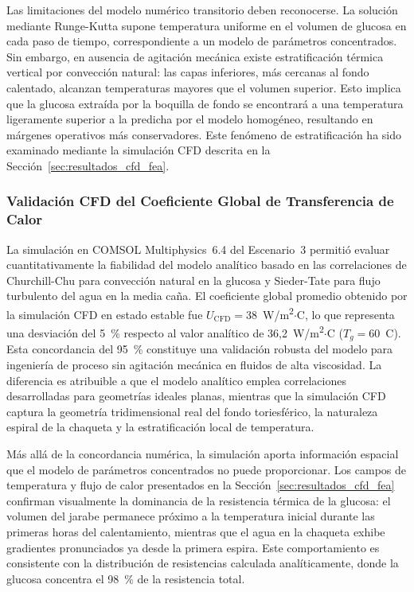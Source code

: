 Las limitaciones del modelo num\'erico transitorio deben reconocerse. La soluci\'on mediante Runge-Kutta supone temperatura uniforme en el volumen de glucosa en cada paso de tiempo, correspondiente a un modelo de par\'ametros concentrados. Sin embargo, en ausencia de agitaci\'on mec\'anica existe estratificaci\'on t\'ermica vertical por convecci\'on natural: las capas inferiores, m\'as cercanas al fondo calentado, alcanzan temperaturas mayores que el volumen superior. Esto implica que la glucosa extra\'ida por la boquilla de fondo se encontrar\'a a una temperatura ligeramente superior a la predicha por el modelo homog\'eneo, resultando en m\'argenes operativos m\'as conservadores. Este fen\'omeno de estratificaci\'on ha sido examinado mediante la simulaci\'on CFD descrita en la Secci\'on~\ref{sec:resultados_cfd_fea}.

\subsubsection{Validaci\'on CFD del Coeficiente Global de Transferencia de Calor}

La simulaci\'on en COMSOL Multiphysics~6.4 del Escenario~3 permiti\'o evaluar cuantitativamente la fiabilidad del modelo anal\'itico basado en las correlaciones de Churchill-Chu para convecci\'on natural en la glucosa y Sieder-Tate para flujo turbulento del agua en la media ca\~na. El coeficiente global promedio obtenido por la simulaci\'on CFD en estado estable fue $U_{\text{CFD}} = 38$~W/m\textsuperscript{2}$\cdot$\textdegree C, lo que representa una desviaci\'on del 5~\% respecto al valor anal\'itico de 36,2~W/m\textsuperscript{2}$\cdot$\textdegree C ($T_g = 60$~\textdegree C). Esta concordancia del 95~\% constituye una validaci\'on robusta del modelo para ingenier\'ia de proceso sin agitaci\'on mec\'anica en fluidos de alta viscosidad. La diferencia es atribuible a que el modelo anal\'itico emplea correlaciones desarrolladas para geometr\'ias ideales planas, mientras que la simulaci\'on CFD captura la geometr\'ia tridimensional real del fondo toriesf\'erico, la naturaleza espiral de la chaqueta y la estratificaci\'on local de temperatura.

M\'as all\'a de la concordancia num\'erica, la simulaci\'on aporta informaci\'on espacial que el modelo de par\'ametros concentrados no puede proporcionar. Los campos de temperatura y flujo de calor presentados en la Secci\'on~\ref{sec:resultados_cfd_fea} confirman visualmente la dominancia de la resistencia t\'ermica de la glucosa: el volumen del jarabe permanece pr\'oximo a la temperatura inicial durante las primeras horas del calentamiento, mientras que el agua en la chaqueta exhibe gradientes pronunciados ya desde la primera espira. Este comportamiento es consistente con la distribuci\'on de resistencias calculada anal\'iticamente, donde la glucosa concentra el 98~\% de la resistencia total.

